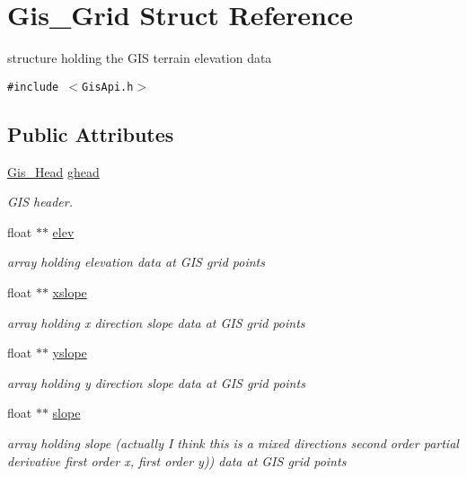 \hypertarget{structGis__Grid}{
\section{Gis\_\-Grid Struct Reference}
\label{structGis__Grid}
}
structure holding the GIS terrain elevation data  


{\tt \#include $<$Gis\-Api.h$>$}

\subsection*{Public Attributes}
\begin{CompactItemize}
\item 
\hyperlink{structGis__Head}{Gis\_\-Head} \hyperlink{structGis__Grid_o0}{ghead}
\begin{CompactList}\small\item\em GIS header. \item\end{CompactList}\item 
float $\ast$$\ast$ \hyperlink{structGis__Grid_o1}{elev}
\begin{CompactList}\small\item\em array holding elevation data at GIS grid points \item\end{CompactList}\item 
float $\ast$$\ast$ \hyperlink{structGis__Grid_o2}{xslope}
\begin{CompactList}\small\item\em array holding x direction slope data at GIS grid points \item\end{CompactList}\item 
float $\ast$$\ast$ \hyperlink{structGis__Grid_o3}{yslope}
\begin{CompactList}\small\item\em array holding y direction slope data at GIS grid points \item\end{CompactList}\item 
float $\ast$$\ast$ \hyperlink{structGis__Grid_o4}{slope}
\begin{CompactList}\small\item\em array holding slope (actually I think this is a mixed directions second order partial derivative first order x, first order y)) data at GIS grid points \item\end{CompactList}\item 

\end{CompactItemize}
